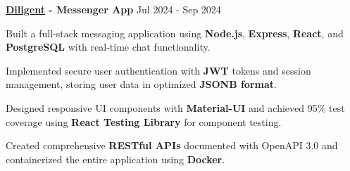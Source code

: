 \begin{cventries}
\vspace{2mm}
\cventry
    {\textbf{\href{https://github.com/howwyhoward/Diligent}{Diligent} - Messenger App}} %
    {} %
    {} %
    {Jul 2024 - Sep 2024} %
    { %
        \begin{cvitems}
            \item {Built a full-stack messaging application using \textbf{Node.js}, \textbf{Express}, \textbf{React}, and \textbf{PostgreSQL} with real-time chat functionality.}
            \item {Implemented secure user authentication with \textbf{JWT} tokens and session management, storing user data in optimized \textbf{JSONB format}.}
            \item {Designed responsive UI components with \textbf{Material-UI} and achieved 95\% test coverage using \textbf{React Testing Library} for component testing.}
            \item {Created comprehensive \textbf{RESTful APIs} documented with OpenAPI 3.0 and containerized the entire application using \textbf{Docker}.}
        \end{cvitems}  
    }
\end{cventries}
